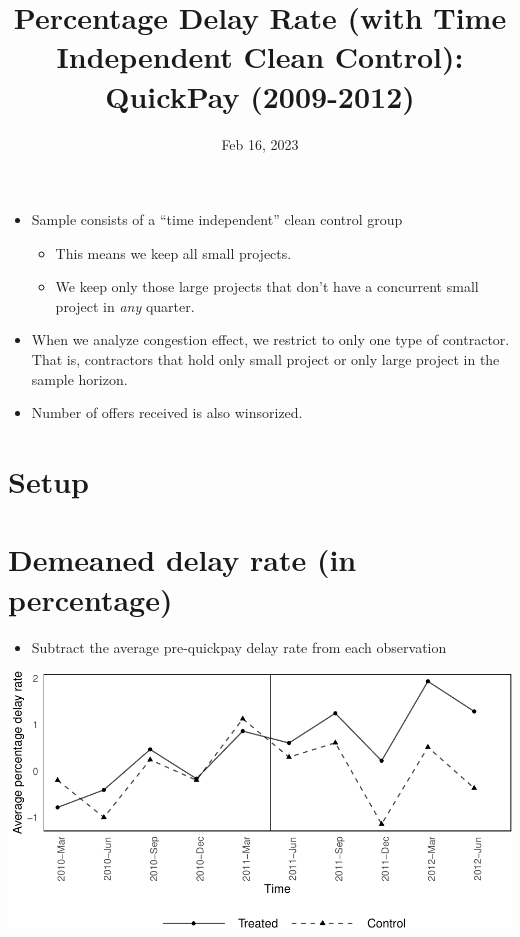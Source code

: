 \documentclass[
]{article}
\title{Percentage Delay Rate (with Time Independent Clean Control):
QuickPay (2009-2012)}
\author{}
\date{\vspace{-2.5em}Feb 16, 2023}
\providecommand{\tightlist}{%
  \setlength{\itemsep}{0pt}\setlength{\parskip}{0pt}}
\begin{document}
\maketitle

\begin{itemize}
\item
  Sample consists of a ``time independent'' clean control group

  \begin{itemize}
  \tightlist
  \item
    This means we keep all small projects.
  \item
    We keep only those large projects that don't have a concurrent small
    project in \emph{any} quarter.
  \end{itemize}
\item
  When we analyze congestion effect, we restrict to only one type of
  contractor. That is, contractors that hold only small project or only
  large project in the sample horizon.
\item
  Number of offers received is also winsorized.
\end{itemize}

\hypertarget{setup}{%
\section{Setup}\label{setup}}

\hypertarget{demeaned-delay-rate-in-percentage}{%
\section{Demeaned delay rate (in
percentage)}\label{demeaned-delay-rate-in-percentage}}

\begin{itemize}
\tightlist
\item
  Subtract the average pre-quickpay delay rate from each observation
\end{itemize}

\includegraphics{qp_first_pc_delay_clean_control_time_independent_files/figure-latex/demeaned_plot_one_type-1.pdf}
\end{document}
